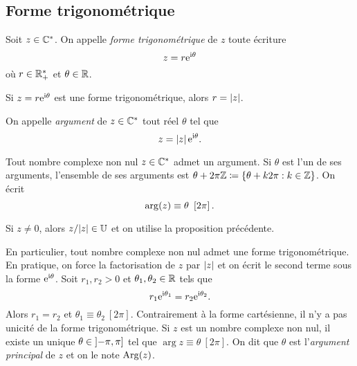 \documentclass{magnolia}
\begin{document}
\subsection{Forme trigonométrique}

\begin{definition}
Soit $z\in\mathbb{C}^*$. On appelle \emph{forme trigonométrique} de $z$ toute écriture
\[z=r {\rm e}^{{\rm i}\theta}\]
où $r\in\mathbb{R}_+^*$ et $\theta\in\mathbb{R}$.
\end{definition}

\begin{remarqueUnique}
\remarque Si $z=r{\rm e}^{{\rm i}\theta}$ est une forme trigonométrique, alors $r=\left|z\right|$.
\end{remarqueUnique}

\begin{definition}[utile=-3]
On appelle \emph{argument} de $z\in\mathbb{C}^*$ tout réel
$\theta$ tel que
\[z=\left|z\right|{\rm e}^{{\rm i}\theta}.\]
\end{definition}

\begin{proposition}[utile=-3]
Tout nombre complexe non nul $z\in\mathbb{C}^*$ admet un argument. Si $\theta$ est l'un de ses arguments, l'ensemble de ses arguments est
$\theta+2\pi\mathbb{Z}\coloneqq\left\{\theta+k2\pi : k\in\mathbb{Z}\right\}$. On écrit
\[\arg(z)\equiv\theta\ \cro{2\pi}.\]
\end{proposition}

\begin{preuve}
Si $z\neq 0$, alors $z/|z| \in \U$ et on utilise la proposition précédente.
\end{preuve}

\begin{remarques}
\remarque En particulier, tout nombre complexe non nul admet une forme trigonométrique. En pratique, on force la factorisation de $z$ par $\left|z\right|$ et on écrit le second terme sous la forme ${\rm e}^{{\rm i}\theta}$.
\remarque Soit $r_1,r_2>0$ et $\theta_1,\theta_2\in\mathbb{R}$ tels que
  \[r_1{\rm e}^{{\rm i}\theta_1}=r_2{\rm e}^{{\rm i}\theta_2}.\]
  Alors $r_1=r_2$ et $\theta_1\equiv\theta_2\ [2\pi]$. Contrairement à la forme cartésienne, il n'y a pas unicité de la forme trigonométrique.
\remarque Si $z$ est un nombre complexe non nul, il existe un unique
  $\theta\in\left]-\pi,\pi\right]$ tel que $\arg z\equiv \theta\ [2\pi]$.
  On dit que $\theta$ est l'\emph{argument principal} de $z$ et on le note
  $\operatorname{Arg}(z)$.
\end{remarques}
\end{document}
